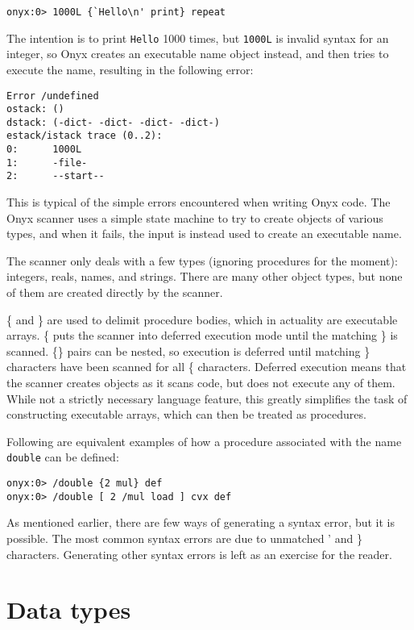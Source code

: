 \begin{verbatim}
onyx:0> 1000L {`Hello\n' print} repeat
\end{verbatim}

The intention is to print {\tt Hello} 1000 times, but {\tt 1000L} is invalid
syntax for an integer, so Onyx creates an executable name object instead, and
then tries to execute the name, resulting in the following error:

\begin{verbatim}
Error /undefined
ostack: ()
dstack: (-dict- -dict- -dict- -dict-)
estack/istack trace (0..2):
0:      1000L
1:      -file-
2:      --start--
\end{verbatim}

This is typical of the simple errors encountered when writing Onyx code.  The
Onyx scanner uses a simple state machine to try to create objects of various
types, and when it fails, the input is instead used to create an executable
name.

The scanner only deals with a few types (ignoring procedures for the moment):
integers, reals, names, and strings.  There are many other object types, but
none of them are created directly by the scanner.

\{ and \} are used to delimit procedure bodies, which in actuality are
executable arrays.  \{ puts the scanner into deferred execution mode until the
matching \} is scanned.  \{\} pairs can be nested, so execution is deferred
until matching \} characters have been scanned for all \{ characters.  Deferred
execution means that the scanner creates objects as it scans code, but does not
execute any of them.  While not a strictly necessary language feature, this
greatly simplifies the task of constructing executable arrays, which can then be
treated as procedures.

Following are equivalent examples of how a procedure associated with the name
{\tt double} can be defined:

\begin{verbatim}
onyx:0> /double {2 mul} def
onyx:0> /double [ 2 /mul load ] cvx def
\end{verbatim}

As mentioned earlier, there are few ways of generating a syntax error, but it is
possible.  The most common syntax errors are due to unmatched ' and \}
characters.  Generating other syntax errors is left as an exercise for the
reader.

\section{Data types}

